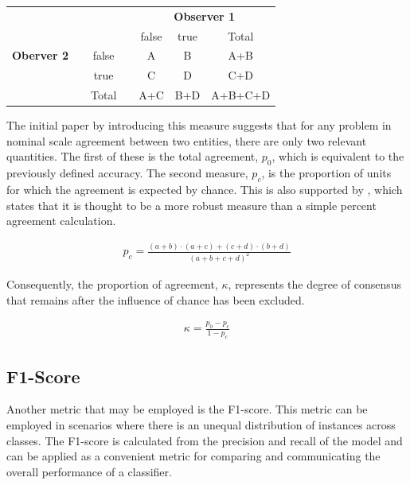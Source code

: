 \documentclass[
a4paper, 
12pt,
grayscalebody, %
abstract=on,
twoside, BCOR10mm, 12pt, DIV13,headinclude, footexclude, final, abstracton, openright
]{ibireprt}
\numberwithin{equation}{chapter}
\numberwithin{table}{chapter}
\numberwithin{figure}{chapter}
\numberwithin{algorithm}{chapter}
\numberwithin{example}{chapter}
\numberwithin{example}{chapter}
\begin{document}
\newcommand{\STAB}[1]{\begin{tabular}{@{}c@{}}#1\end{tabular}}
\begin{center}
	\begin{tabular}{ccccccc}
		\hline
		&&&&\multicolumn{3}{c}{\textbf{Observer 1}}\\
		&&&&false&true&Total\\
		\hline
		\textbf{Oberver 2}&&false& &A &B &A+B \\
		
		&&true&&C&D&C+D\\
		
		&&Total&&A+C&B+D&A+B+C+D\\
	\end{tabular}
\end{center}

The initial paper by \citet{Cohen1960} introducing this measure suggests that for any problem in nominal scale agreement between two entities, there are only two relevant quantities. The first of these is the total agreement, $p_0$, which is equivalent to the previously defined accuracy. The second measure, $p_c$, is the proportion of units for which the agreement is expected by chance. This is also supported by \citet{Vieira2010}, which states that it is thought to be a more robust measure than a simple percent agreement calculation.

\begin{align}
	p_c =\frac{(a+b)\cdot(a+c)+(c+d)\cdot(b+d)}{(a+b+c+d)^2}
\end{align}

Consequently, the proportion of agreement, $\kappa$, represents the degree of consensus that remains after the influence of chance has been excluded. 

\begin{align}
	\kappa = \frac{p_0-p_c}{1-p_c}
\end{align}

\subsection{F1-Score}
Another metric that may be employed is the F1-score. This metric can be employed in scenarios where there is an unequal distribution of instances across classes. The F1-score is calculated from the precision and recall of the model and can be applied as a convenient metric for comparing and communicating the overall performance of a classifier. 
\end{document}
